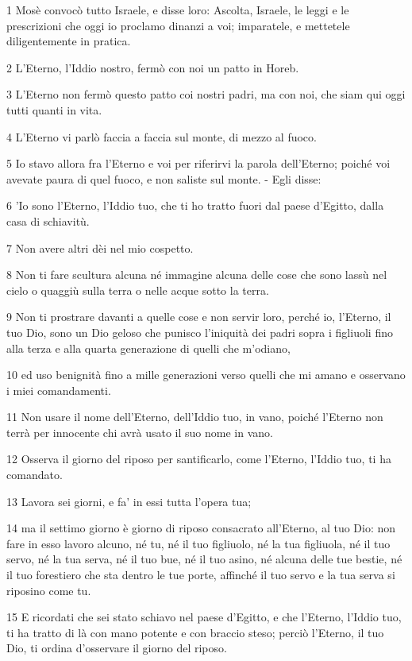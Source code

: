 \par 1 Mosè convocò tutto Israele, e disse loro: Ascolta, Israele, le leggi e le prescrizioni che oggi io proclamo dinanzi a voi; imparatele, e mettetele diligentemente in pratica.
\par 2 L'Eterno, l'Iddio nostro, fermò con noi un patto in Horeb.
\par 3 L'Eterno non fermò questo patto coi nostri padri, ma con noi, che siam qui oggi tutti quanti in vita.
\par 4 L'Eterno vi parlò faccia a faccia sul monte, di mezzo al fuoco.
\par 5 Io stavo allora fra l'Eterno e voi per riferirvi la parola dell'Eterno; poiché voi avevate paura di quel fuoco, e non saliste sul monte. - Egli disse:
\par 6 'Io sono l'Eterno, l'Iddio tuo, che ti ho tratto fuori dal paese d'Egitto, dalla casa di schiavitù.
\par 7 Non avere altri dèi nel mio cospetto.
\par 8 Non ti fare scultura alcuna né immagine alcuna delle cose che sono lassù nel cielo o quaggiù sulla terra o nelle acque sotto la terra.
\par 9 Non ti prostrare davanti a quelle cose e non servir loro, perché io, l'Eterno, il tuo Dio, sono un Dio geloso che punisco l'iniquità dei padri sopra i figliuoli fino alla terza e alla quarta generazione di quelli che m'odiano,
\par 10 ed uso benignità fino a mille generazioni verso quelli che mi amano e osservano i miei comandamenti.
\par 11 Non usare il nome dell'Eterno, dell'Iddio tuo, in vano, poiché l'Eterno non terrà per innocente chi avrà usato il suo nome in vano.
\par 12 Osserva il giorno del riposo per santificarlo, come l'Eterno, l'Iddio tuo, ti ha comandato.
\par 13 Lavora sei giorni, e fa' in essi tutta l'opera tua;
\par 14 ma il settimo giorno è giorno di riposo consacrato all'Eterno, al tuo Dio: non fare in esso lavoro alcuno, né tu, né il tuo figliuolo, né la tua figliuola, né il tuo servo, né la tua serva, né il tuo bue, né il tuo asino, né alcuna delle tue bestie, né il tuo forestiero che sta dentro le tue porte, affinché il tuo servo e la tua serva si riposino come tu.
\par 15 E ricordati che sei stato schiavo nel paese d'Egitto, e che l'Eterno, l'Iddio tuo, ti ha tratto di là con mano potente e con braccio steso; perciò l'Eterno, il tuo Dio, ti ordina d'osservare il giorno del riposo.
